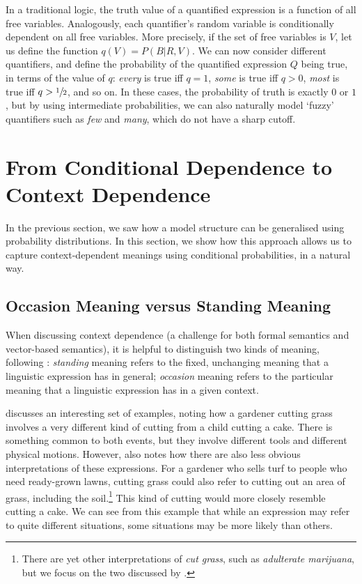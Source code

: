 \documentclass[a4paper,11pt]{article}
\begin{document}
In a traditional logic, the truth value of a quantified expression
is a function of all free variables.
Analogously, each quantifier's random variable is conditionally dependent on all free variables.
More precisely, if the set of free variables is $V$,
let us define the function $q(V)=P(B|R,V)$.
We can now consider different quantifiers,
and define the probability of the quantified expression $Q$ being true,
in terms of the value of $q$:
\textit{every} is true iff $q=1$,
\textit{some} is true iff $q>0$,
\textit{most} is true iff $q>\sfrac{1}{2}$, and so on.
In these cases, the probability of truth is exactly $0$ or $1$,
but by using intermediate probabilities, we can also naturally model `fuzzy' quantifiers
such as \textit{few} and \textit{many},
which do not have a sharp cutoff.


\pagebreak


\section{From Conditional Dependence to Context Dependence}
\label{sec:depend}

In the previous section, we saw how a model structure can be generalised using probability distributions.
In this section, we show how this approach allows us to capture context-dependent meanings
using conditional probabilities, in a natural way.


\subsection{Occasion Meaning versus Standing Meaning}
\label{sec:context}

When discussing context dependence
(a challenge for both formal semantics and vector-based semantics),
it is helpful to distinguish two kinds of meaning, following \citet{quine1960meaning}:
\textit{standing} meaning refers to the fixed, unchanging meaning that a linguistic expression has in general;
\textit{occasion} meaning refers to the particular meaning that a linguistic expression has in a given context.

\citet{searle1980meaning} discusses an interesting set of examples,
noting how a gardener cutting grass
involves a very different kind of cutting from a child cutting a cake.
There is something common to both events,
but they involve different tools and different physical motions.
However, \citeauthor{searle1980meaning} also notes
how there are also less obvious interpretations of these expressions.
For a gardener who sells turf to people who need ready-grown lawns,
cutting grass could also refer to cutting out an area of grass, including the soil.\footnote{%
	There are yet other interpretations of \textit{cut grass},
	such as \textit{adulterate marijuana},
	but we focus on the two discussed by \citeauthor{searle1980meaning}.
}
This kind of cutting would more closely resemble cutting a cake.
We can see from this example that
while an expression may refer to quite different situations,
some situations may be more likely than others.
\end{document}
